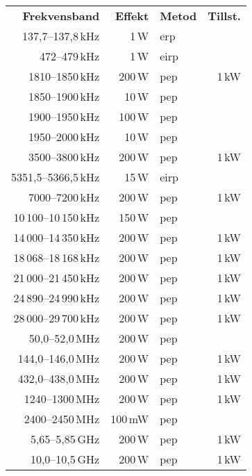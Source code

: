 \begin{tabular}{rrlr}
	\textbf{Frekvensband} & \textbf{Effekt} & \textbf{Metod} & \textbf{Tillst.} \\
	    137,7--137,8\,kHz &            1\,W & erp            &  \\
	        472--479\,kHz &            1\,W & eirp           &  \\
	      1810--1850\,kHz &          200\,W & pep            &            1\,kW \\
	      1850--1900\,kHz &           10\,W & pep            &  \\
	      1900--1950\,kHz &          100\,W & pep            &  \\
	      1950--2000\,kHz &           10\,W & pep            &  \\
	      3500--3800\,kHz &          200\,W & pep            &            1\,kW \\
	  5351,5--5366,5\,kHz &           15\,W & eirp           &  \\
	      7000--7200\,kHz &          200\,W & pep            &            1\,kW \\
	10\,100--10\,150\,kHz &          150\,W & pep            &  \\
	14\,000--14\,350\,kHz &          200\,W & pep            &            1\,kW \\
	18\,068--18\,168\,kHz &          200\,W & pep            &            1\,kW \\
	21\,000--21\,450\,kHz &          200\,W & pep            &            1\,kW \\
	24\,890--24\,990\,kHz &          200\,W & pep            &            1\,kW \\
	28\,000--29\,700\,kHz &          200\,W & pep            &            1\,kW \\
	      50,0--52,0\,MHz &          200\,W & pep            &  \\
	    144,0--146,0\,MHz &          200\,W & pep            &            1\,kW \\
	    432,0--438,0\,MHz &          200\,W & pep            &            1\,kW \\
	      1240--1300\,MHz &          200\,W & pep            &            1\,kW \\
	      2400--2450\,MHz &         100\,mW & pep            &  \\
	      5,65--5,85\,GHz &          200\,W & pep            &            1\,kW \\
	      10,0--10,5\,GHz &          200\,W & pep            &            1\,kW \\

\end{tabular}
